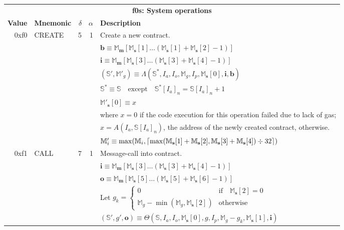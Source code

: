 \documentclass[9pt,oneside]{amsart}
\DeclarePairedDelimiter{\ceil}{\lceil}{\rceil}
\begin{document}
\begin{tabular*}{\columnwidth}[h]{rlrrl}
\toprule
\multicolumn{5}{c}{\textbf{f0s: System operations}} \vspace{5pt} \\
\textbf{Value} & \textbf{Mnemonic} & $\delta$ & $\alpha$ & \textbf{Description} \vspace{5pt} \\
0xf0 & {\small CREATE} & 5 & 1 & Create a new contract. \\
&&&& $\mathbf{b} \equiv \mathbb{M}_\mathbf{m}[ \mathbb{M}_\mathbf{s}[1] \dots (\mathbb{M}_\mathbf{s}[1] + \mathbb{M}_\mathbf{s}[2] - 1) ]$ \\
&&&& $\mathbf{i} \equiv \mathbb{M}_\mathbf{m}[ \mathbb{M}_\mathbf{s}[3] \dots (\mathbb{M}_\mathbf{s}[3] + \mathbb{M}_\mathbf{s}[4] - 1) ]$ \\
&&&& $(\mathbb{S}', \mathbb{M}'_g) \equiv \Lambda(\mathbb{S}^*, I_a, I_o, \mathbb{M}_g, I_p, \mathbb{M}_\mathbf{s}[0], \mathbf{i}, \mathbf{b})$ \\
&&&& $\mathbb{S}^* \equiv \mathbb{S} \quad \text{except} \quad \mathbb{S}^*[I_a]_n = \mathbb{S}[I_a]_n + 1$ \\
&&&& $\mathbb{M}'_\mathbf{s}[0] \equiv x$ \\
&&&& where $x=0$ if the code execution for this operation failed due to lack of gas;\\
&&&& $x=A(I_a, \mathbb{S}[I_a]_n)$, the address of the newly created contract, otherwise. \\
&&&& $\mathbb{M}'_i \equiv \max(\mathbb{M}_i, \ceil{ \max(\mathbb{M}_\mathbf{s}[1] + \mathbb{M}_\mathbf{s}[2], \mathbb{M}_\mathbf{s}[3] + \mathbb{M}_\mathbf{s}[4]) \div 32 })$ \\
\midrule
0xf1 & {\small CALL} & 7 & 1 & Message-call into contract. \\
&&&& $\mathbf{i} \equiv \mathbb{M}_\mathbf{m}[ \mathbb{M}_\mathbf{s}[3] \dots (\mathbb{M}_\mathbf{s}[3] + \mathbb{M}_\mathbf{s}[4] - 1) ]$ \\
&&&& $\mathbf{o} \equiv \mathbb{M}_\mathbf{m}[ \mathbb{M}_\mathbf{s}[5] \dots (\mathbb{M}_\mathbf{s}[5] + \mathbb{M}_\mathbf{s}[6] - 1) ]$ \\
&&&& Let $g_k = \begin{cases}0 & \text{if} \quad \mathbb{M}_\mathbf{s}[2] = 0 \\ \mathbb{M}_g - \min(\mathbb{M}_g, \mathbb{M}_\mathbf{s}[2]) & \text{otherwise} \end{cases}$ \\
&&&& $(\mathbb{S}', g', \mathbf{o}) \equiv \Theta(\mathbb{S}, I_a, I_o, \mathbb{M}_\mathbf{s}[0], g, I_p, \mathbb{M}_g - g_k, \mathbb{M}_\mathbf{s}[1], \mathbf{i})$ \\

\end{tabular*}
\end{document}
